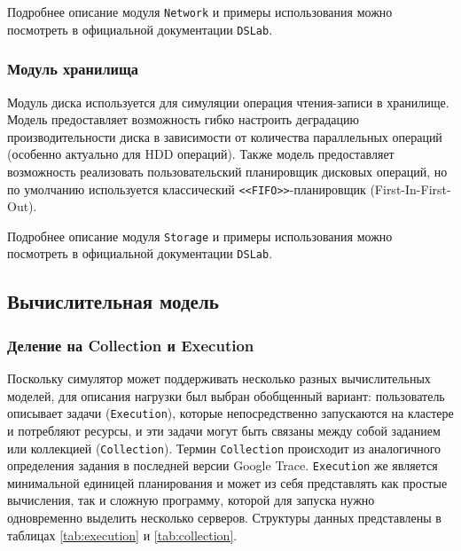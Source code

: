 Подробнее описание модуля \texttt{Network} и примеры использования можно посмотреть в официальной документации \texttt{DSLab}\cite{dslab-network-docs}.

\subsubsection{Модуль хранилища}

Модуль диска используется для симуляции операция чтения-записи в хранилище. Модель предоставляет возможность гибко настроить деградацию производительности диска в зависимости от количества параллельных операций (особенно актуально для HDD операций). Также модель предоставляет возможность реализовать пользовательский планировщик дисковых операций, но по умолчанию используется классический \texttt{<<FIFO>>}-планировщик (First-In-First-Out).  

Подробнее описание модуля \texttt{Storage} и примеры использования можно посмотреть в официальной документации \texttt{DSLab}\cite{dslab-storage-docs}.




\subsection{Вычислительная модель}\label{compute-model}

\subsubsection{Деление на Collection и Execution}\label{sec:execution-collection-model}

Поскольку симулятор может поддерживать несколько разных вычислительных моделей, для описания нагрузки был выбран обобщенный вариант: пользователь описывает задачи (\texttt{Execution}), которые непосредственно запускаются на кластере и потребляют ресурсы, и эти задачи могут быть связаны между собой заданием или коллекцией (\texttt{Collection}). Термин \texttt{Collection} происходит из аналогичного определения задания в последней версии Google Trace\cite{google-clusterdata}. \texttt{Execution} же является минимальной единицей планирования и может из себя представлять как простые вычисления, так и сложную программу, которой для запуска нужно одновременно выделить несколько серверов. Структуры данных представлены в таблицах \ref{tab:execution} и \ref{tab:collection}.

